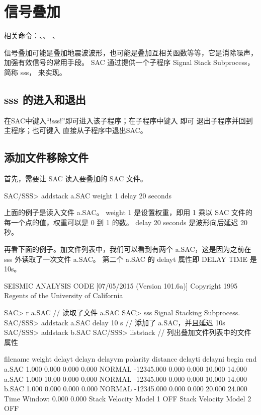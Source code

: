 \section{信号叠加}
\label{sec:stack-files}
相关命令：、、
、

信号叠加可能是叠加地震波波形，也可能是叠加互相关函数等等，它是消除噪声，加强有效信号的常用手段。
SAC 通过提供一个子程序 Signal Stack Subprocess，简称 sss， 来实现。

\subsection{sss 的进入和退出}
在SAC中键入``!sss!''即可进入该子程序；在子程序中键入  即可
退出子程序并回到主程序；也可键入  直接从子程序中退出SAC。

\subsection{添加文件移除文件}

首先，需要让 SAC 读入要叠加的 SAC 文件。

\begin{SACCode}
SAC/SSS> addstack a.SAC weight 1 delay 20 seconds
\end{SACCode}

上面的例子是读入文件 a.SAC。
weight 1 是设置权重，即用 1 乘以 SAC 文件的每一个点的值，权重可以是 0 到 1 的数。
delay 20 seconds 是波形向后延迟 20 秒。

再看下面的例子。加文件列表中，我们可以看到有两个 a.SAC，这是因为之前在 sss 外读取了一次文件 a.SAC。
第二个 a.SAC 的 delayt 属性即 DELAY TIME 是 10s。

\begin{SACCode}
SEISMIC ANALYSIS CODE [07/05/2015 (Version 101.6a)]
Copyright 1995 Regents of the University of California

SAC> r a.SAC    // 读取了文件 a.SAC
SAC> sss
Signal Stacking Subprocess.
SAC/SSS> addstack a.SAC delay 10 s    // 添加了 a.SAC，并且延迟 10s
SAC/SSS> addstack b.SAC
SAC/SSS> liststack    // 列出叠加文件列表中的文件属性

 filename  weight      delayt      delayn     delayvm   polarity   distance
                           delayti     delayni      begin       end
 a.SAC         1.000       0.000       0.000       0.000   NORMAL   -12345.000
                             0.000       0.000      10.000      14.000
 a.SAC         1.000       10.00       0.000       0.000   NORMAL   -12345.000
                             0.000       0.000      10.000      14.000
 b.SAC         1.000       0.000       0.000       0.000   NORMAL   -12345.000
                             0.000       0.000      20.000      24.000
 Time Window:       0.000       0.000
 Stack Velocity Model 1 OFF
 Stack Velocity Model 2 OFF
\end{SACCode}

